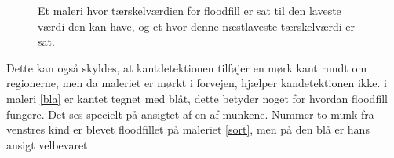 \begin{figure}[!h]
    \centering
     \caption{Et maleri hvor tærskelværdien for floodfill er sat til den laveste værdi den kan have, og et hvor denne næstlaveste tærskelværdi er sat.}
     \label{ff_munke}
\end{figure}

Dette kan også skyldes, at kantdetektionen tilføjer en mørk kant rundt
om regionerne, men da maleriet er mørkt i forvejen, hjælper
kandetektionen ikke. i maleri \ref{bla} er kantet tegnet med blåt, dette betyder noget for hvordan floodfill fungere.
Det ses specielt på ansigtet af en af munkene. Nummer to munk fra venstres kind er blevet floodfillet på maleriet \ref{sort}, men på den blå er hans ansigt velbevaret.

